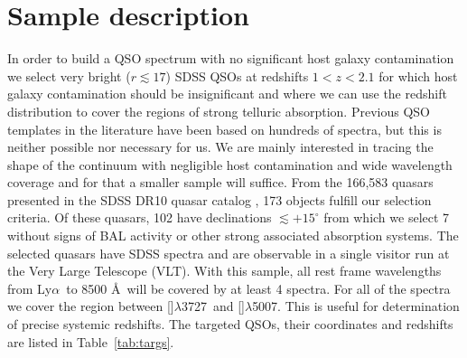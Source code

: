 \documentclass{aa}    %
\newcommand{\Tab}[1]{Table~\ref{tab:#1}}
\newcommand{\tab}[1]{\Tab{#1}}
\newcommand{\sectlabel}[1]{\label{sect:#1}}
\newcommand{\lya}{Ly$\alpha$}
\newcommand{\oii}{[\ion{O}{ii}]$\lambda$3727}
\newcommand{\oiii}{[\ion{O}{iii}]$\lambda$5007}
\begin{document}
\section{Sample description}   \sectlabel{sample}

In order to build a QSO spectrum with no significant host galaxy
contamination we select very bright ($r \lesssim 17$) SDSS QSOs at
redshifts $1 < z < 2.1$ for which host galaxy contamination should be
insignificant and where we can use the redshift distribution to cover
the regions of strong telluric absorption. Previous QSO templates in
the literature have been based on hundreds of spectra, but this is
neither possible nor necessary for us. We are mainly interested in
tracing the shape of the continuum with negligible host contamination
and wide wavelength coverage and for that a smaller sample will
suffice. From the 166,583 quasars presented in the SDSS DR10 quasar catalog \citep{Paris2014}, 173 objects fulfill our selection criteria. Of these quasars, 102 have declinations $\lesssim +15^\circ$ from which we select 7 without signs of BAL activity or other strong associated absorption systems. The selected quasars have SDSS spectra and are observable in a single visitor run at the Very Large Telescope (VLT). With this sample, all rest frame
wavelengths from \lya~to 8500 \AA~will be covered by at least 4
spectra. For all of the spectra we cover the region between \oii~and
\oiii. This is useful for determination of precise systemic
redshifts. The targeted QSOs, their coordinates and redshifts are
listed in \tab{targs}.
\end{document}
